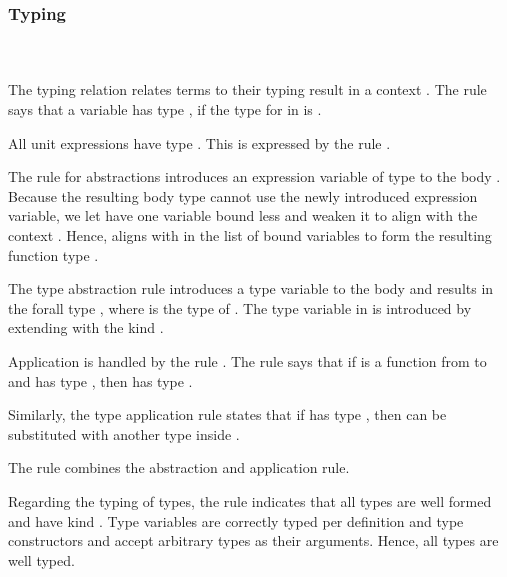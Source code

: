 \subsubsection{Typing}\hfill\\\\
The typing relation    \Data{:}  relates terms  to their typing result  in a context .
\FTyping
The rule  says that a variable   has type , if the type for  in  is . 

\noindent All unit expressions  have type . This is expressed by the rule .

\noindent The rule for abstractions  introduces an expression variable of type  to the body . 
Because the resulting body type  cannot use the newly introduced expression variable, we let  have one variable bound less and weaken it to align with the context   . 
Hence,  aligns with  in the list of bound variables to form the resulting function type   . 

\noindent The type abstraction rule  introduces a type variable to the body  and results in the forall type  , where  is the type of . The type variable in  is introduced by extending  with the kind . 

\noindent Application is handled by the rule . The rule says that if  is a function from  to  and  has type , then    has type . 

\noindent Similarly, the type application rule  states that if  has type  , then  can be substituted with another type  inside . 

\noindent The rule  combines the abstraction and application rule.

\noindent Regarding the typing of types, the rule  indicates that all types  are well formed and have kind . Type variables are correctly typed per definition and type constructors  and  accept arbitrary types as their arguments. Hence, all types are well typed.


